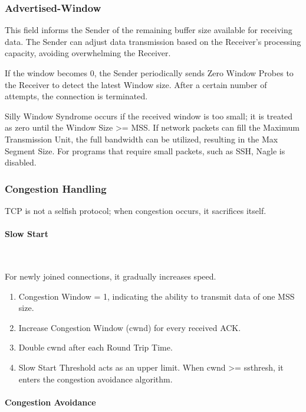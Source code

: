 \documentclass[11pt,journal,compsoc]{IEEEtran}
\begin{document}
\subsubsection{Advertised-Window}

This field informs the Sender of the remaining buffer size available for receiving data. The Sender can adjust data transmission based on the Receiver's processing capacity, avoiding overwhelming the Receiver.

If the window becomes 0, the Sender periodically sends Zero Window Probes to the Receiver to detect the latest Window size. After a certain number of attempts, the connection is terminated.

Silly Window Syndrome occurs if the received window is too small; it is treated as zero until the Window Size >= MSS. If network packets can fill the Maximum Transmission Unit, the full bandwidth can be utilized, resulting in the Max Segment Size. For programs that require small packets, such as SSH, Nagle is disabled.


\subsubsection{Congestion Handling}

TCP is not a selfish protocol; when congestion occurs, it sacrifices itself.

\paragraph{Slow Start} ~

For newly joined connections, it gradually increases speed.

\begin{enumerate}
    \item Congestion Window = 1, indicating the ability to transmit data of one MSS size.
    
    \item Increase Congestion Window (cwnd) for every received ACK.
    
    \item Double cwnd after each Round Trip Time.
    
    \item Slow Start Threshold acts as an upper limit. When cwnd >= ssthresh, it enters the congestion avoidance algorithm.
\end{enumerate}

\paragraph{Congestion Avoidance} ~
\end{document}
